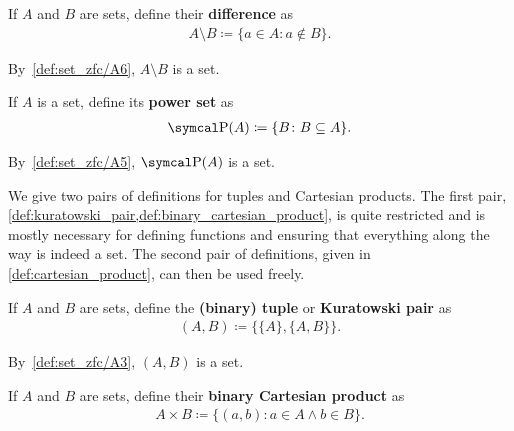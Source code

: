 \begin{definition}\label{def:set_difference}\cite[27]{Enderton1977}
  If \( A \) and \( B \) are sets, define their \textbf{difference} as
  \begin{align*}
    A \setminus B \coloneqq \{ a \in A \colon a \not\in B \}.
  \end{align*}

  By~\ref{def:set_zfc/A6}, \( A \setminus B \) is a set.
\end{definition}

\begin{definition}\label{def:power_set}\cite[19]{Enderton1977}
  If \( A \) is a set, define its \textbf{power set} as
  \begin{align*}
    \Power(A) \coloneqq \{ B \colon B \subseteq A \}.
  \end{align*}

  By~\ref{def:set_zfc/A5}, \( \Power(A) \) is a set.
\end{definition}

\begin{note}
  We give two pairs of definitions for tuples and Cartesian products. The first pair, \cref{def:kuratowski_pair,def:binary_cartesian_product}, is quite restricted and is mostly necessary for defining functions and ensuring that everything along the way is indeed a set. The second pair of definitions, given in \cref{def:cartesian_product}, can then be used freely.
\end{note}

\begin{definition}\label{def:kuratowski_pair}\cite[36]{Enderton1977}
  If \( A \) and \( B \) are sets, define the \textbf{(binary) tuple} or \textbf{Kuratowski pair} as
  \begin{align*}
    (A, B) \coloneqq \{ \{ A \}, \{ A, B \} \}.
  \end{align*}

  By~\ref{def:set_zfc/A3}, \( (A, B) \) is a set.
\end{definition}

\begin{definition}\label{def:binary_cartesian_product}\cite[37]{Enderton1977}
  If \( A \) and \( B \) are sets, define their \textbf{binary Cartesian product} as
  \begin{align*}
    A \times B \coloneqq \{ (a, b) \colon a \in A \land b \in B \}.
  \end{align*}
\end{definition}

